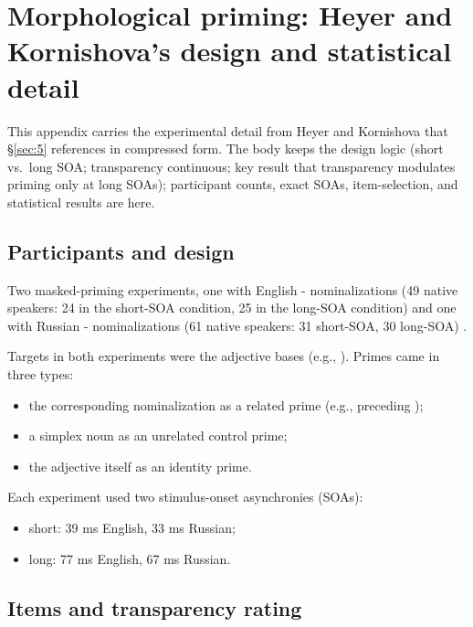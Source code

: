 \section{Morphological priming: Heyer and Kornishova's design and statistical detail}\label{sec:C}

This appendix carries the experimental detail from Heyer and Kornishova \autocite*{heyer-kornishova-2018-priming-eventually} that §\ref{sec:5} references in compressed form. The body keeps the design logic (short vs.~long SOA; transparency continuous; key result that transparency modulates priming only at long SOAs); participant counts, exact SOAs, item-selection, and statistical results are here.

\subsection{Participants and design}

Two masked-priming experiments, one with English - nominalizations (49 native speakers: 24 in the short-SOA condition, 25 in the long-SOA condition) and one with Russian - nominalizations (61 native speakers: 31 short-SOA, 30 long-SOA) \autocite[1115]{heyer-kornishova-2018-priming-eventually}.

Targets in both experiments were the adjective bases (e.g., ). Primes came in three types:

\begin{itemize}
\tightlist
\item
  the corresponding nominalization as a related prime (e.g.,  preceding );
\item
  a simplex noun as an unrelated control prime;
\item
  the adjective itself as an identity prime.
\end{itemize}

Each experiment used two stimulus-onset asynchronies (SOAs):

\begin{itemize}
\tightlist
\item
  short: 39 ms English, 33 ms Russian;
\item
  long: 77 ms English, 67 ms Russian.
\end{itemize}

\subsection{Items and transparency rating}

